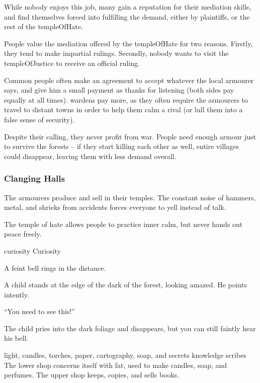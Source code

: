 \begin{multicols}{2}
\begin{description}
  While nobody enjoys this job, many gain a reputation for their mediation skills, and find themselves forced into fulfilling the demand, either by plaintiffs, or the rest of the \gls{templeOfHate}.
\end{description}

\noindent
People value the mediation offered by the \gls{templeOfHate} for two reasons.
Firstly, they tend to make impartial rulings.
Secondly, nobody wants to visit the \gls{templeOfJustice} to receive an official ruling.

Common people often make an agreement to accept whatever the local armourer says, and give him a small payment as thanks for listening (both sides pay equally at all times).
\Glspl{warden} pay more, as they often require the armourers to travel to distant towns in order to help them calm a rival (or lull them into a false sense of security).

Despite their calling, they never profit from war.
People need enough armour just to survive the forests -- if they start killing each other as well, entire \glspl{village} could disappear, leaving them with less demand overall.

\subsubsection{Clanging Halls}
The armourers produce and sell in their temples.
The constant noise of hammers, metal, and shrieks from accidents forces everyone to yell instead of talk.

The temple of hate allows people to practice inner calm, but never hands out peace freely.


  {\gls{curiosity}}%
  {Curiosity}%
  {
    A feint bell rings in the distance.

    A child stands at the edge of the dark of the forest, looking amazed.
    He points intently.

    {\sffamily``You need to see this!''}

    The child pries into the dark foliage and disappears, but you can still faintly hear his bell.
  }%
  {light, candles, torches, paper, cartography, soap, and secrets}%
  {knowledge}%
  {\Glspl{scribe}}%
  {
    The lower shop concerns itself with fat, used to make candles, soap, and perfumes.
    The upper shop keeps, copies, and sells books.
  }%


\end{multicols}
